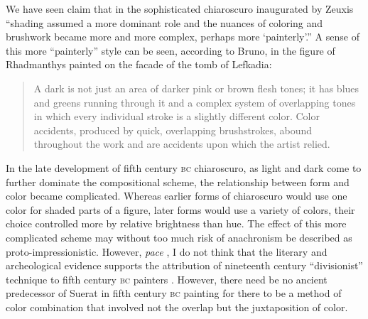 
We have seen \citet[29]{Bruno:1977fk} claim that in the sophisticated chiaroscuro inaugurated by Zeuxis ``shading assumed a more dominant role and the nuances of coloring and brushwork became more and more complex, perhaps more `painterly'.'' A sense of this more ``painterly'' style can be seen, according to Bruno, in the figure of Rhadmanthys painted on the facade of the tomb of Lefkadia:
\begin{quote}
    A dark is not just an area of darker pink or brown flesh tones; it has blues and greens running through it and a complex system of overlapping tones in which every individual stroke is a slightly different color. Color accidents, produced by quick, overlapping brushstrokes, abound throughout the work and are accidents upon which the artist relied. \citep[25]{Bruno:1977fk}
\end{quote}
In the late development of fifth century \textsc{bc} chiaroscuro, as light and dark come to further dominate the compositional scheme, the relationship between form and color became complicated. Whereas earlier forms of chiaroscuro would use one color for shaded parts of a figure, later forms would use a variety of colors, their choice controlled more by relative brightness than hue. The effect of this more complicated scheme may without too much risk of anachronism be described as proto-impressionistic. However, \emph{pace} \citet{Keuls:1975uq}, I do not think that the literary and archeological evidence supports the attribution of nineteenth century ``divisionist'' technique to fifth century \textsc{bc} painters \citep[see][]{Pemberton:1976kx}. However, there need be no ancient predecessor of Suerat in fifth century \textsc{bc} painting for there to be a method of color combination that involved not the overlap but the juxtaposition of color.


